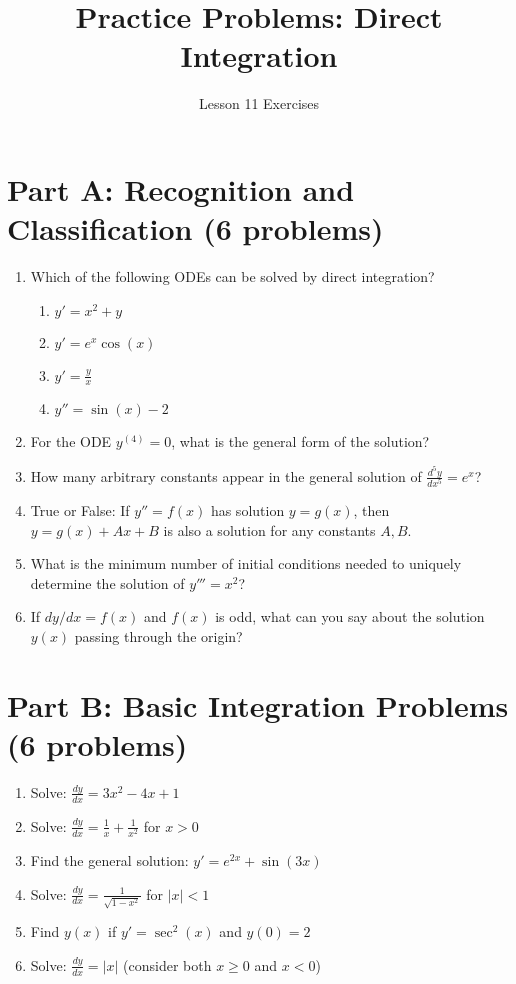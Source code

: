 \documentclass[12pt]{article}
\title{Practice Problems: Direct Integration}
\author{Lesson 11 Exercises}
\begin{document}
\maketitle

\section*{Part A: Recognition and Classification (6 problems)}

\begin{enumerate}
\item Which of the following ODEs can be solved by direct integration?
    \begin{enumerate}
        \item $y' = x^2 + y$
        \item $y' = e^x \cos(x)$
        \item $y' = \frac{y}{x}$
        \item $y'' = \sin(x) - 2$
    \end{enumerate}

\item For the ODE $y^{(4)} = 0$, what is the general form of the solution?

\item How many arbitrary constants appear in the general solution of $\frac{d^5y}{dx^5} = e^x$?

\item True or False: If $y'' = f(x)$ has solution $y = g(x)$, then $y = g(x) + Ax + B$ is also a solution for any constants $A, B$.

\item What is the minimum number of initial conditions needed to uniquely determine the solution of $y''' = x^2$?

\item If $dy/dx = f(x)$ and $f(x)$ is odd, what can you say about the solution $y(x)$ passing through the origin?
\end{enumerate}

\section*{Part B: Basic Integration Problems (6 problems)}

\begin{enumerate}[resume]
\item Solve: $\frac{dy}{dx} = 3x^2 - 4x + 1$

\item Solve: $\frac{dy}{dx} = \frac{1}{x} + \frac{1}{x^2}$ for $x > 0$

\item Find the general solution: $y' = e^{2x} + \sin(3x)$

\item Solve: $\frac{dy}{dx} = \frac{1}{\sqrt{1-x^2}}$ for $|x| < 1$

\item Find $y(x)$ if $y' = \sec^2(x)$ and $y(0) = 2$

\item Solve: $\frac{dy}{dx} = |x|$ (consider both $x \geq 0$ and $x < 0$)
\end{enumerate}
\end{document}

